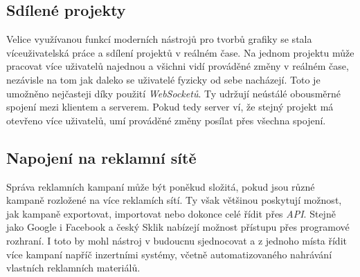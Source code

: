 \subsection{Sdílené projekty}
Velice využívanou funkcí moderních nástrojů pro tvorbů grafiky se stala víceuživatelská práce a sdílení projektů v reálném čase. Na jednom projektu
může pracovat více uživatelů najednou a všichni vidí prováděné změny v reálném čase, nezávisle na tom jak daleko se uživatelé fyzicky od sebe 
nacházejí. Toto je umožněno nejčasteji díky použití \emph{WebSocketů}. Ty udržují neústálé obousměrné spojení mezi klientem a serverem. Pokud tedy server
ví, že stejný projekt má otevřeno více uživatelů, umí prováděné změny posílat přes všechna spojení.

\subsection{Napojení na reklamní sítě}
Správa reklamních kampaní může být poněkud složitá, pokud jsou různé kampaně rozložené na více reklamích sítí. Ty však většinou poskytují možnost,
jak kampaně exportovat, importovat nebo dokonce celé řídit přes \emph{API}. Stejně jako Google i Facebook a český Sklik nabízejí možnost přístupu
přes programové rozhraní. I toto by mohl nástroj v budoucnu sjednocovat a z jednoho místa řídit více kampaní napříč inzertními systémy, včetně
automatizovaného nahrávání vlastních reklamních materiálů.

\endinput